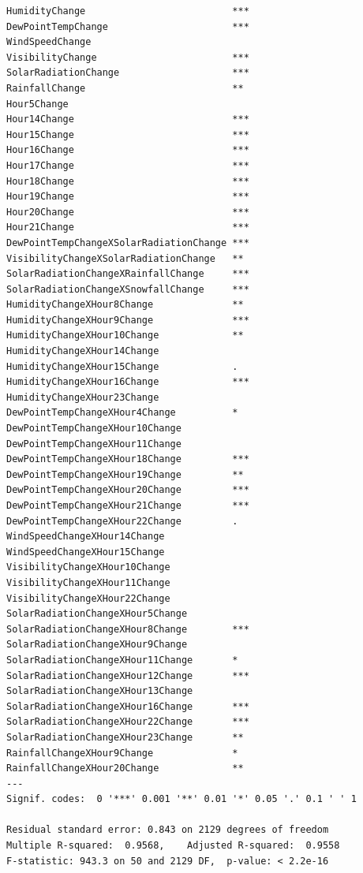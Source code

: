 \documentclass[
  letterpaper,
  DIV=11,
  numbers=noendperiod]{scrartcl}
\begin{document}
\begin{verbatim}
HumidityChange                          ***
DewPointTempChange                      ***
WindSpeedChange                            
VisibilityChange                        ***
SolarRadiationChange                    ***
RainfallChange                          ** 
Hour5Change                                
Hour14Change                            ***
Hour15Change                            ***
Hour16Change                            ***
Hour17Change                            ***
Hour18Change                            ***
Hour19Change                            ***
Hour20Change                            ***
Hour21Change                            ***
DewPointTempChangeXSolarRadiationChange ***
VisibilityChangeXSolarRadiationChange   ** 
SolarRadiationChangeXRainfallChange     ***
SolarRadiationChangeXSnowfallChange     ***
HumidityChangeXHour8Change              ** 
HumidityChangeXHour9Change              ***
HumidityChangeXHour10Change             ** 
HumidityChangeXHour14Change                
HumidityChangeXHour15Change             .  
HumidityChangeXHour16Change             ***
HumidityChangeXHour23Change                
DewPointTempChangeXHour4Change          *  
DewPointTempChangeXHour10Change            
DewPointTempChangeXHour11Change            
DewPointTempChangeXHour18Change         ***
DewPointTempChangeXHour19Change         ** 
DewPointTempChangeXHour20Change         ***
DewPointTempChangeXHour21Change         ***
DewPointTempChangeXHour22Change         .  
WindSpeedChangeXHour14Change               
WindSpeedChangeXHour15Change               
VisibilityChangeXHour10Change              
VisibilityChangeXHour11Change              
VisibilityChangeXHour22Change              
SolarRadiationChangeXHour5Change           
SolarRadiationChangeXHour8Change        ***
SolarRadiationChangeXHour9Change           
SolarRadiationChangeXHour11Change       *  
SolarRadiationChangeXHour12Change       ***
SolarRadiationChangeXHour13Change          
SolarRadiationChangeXHour16Change       ***
SolarRadiationChangeXHour22Change       ***
SolarRadiationChangeXHour23Change       ** 
RainfallChangeXHour9Change              *  
RainfallChangeXHour20Change             ** 
---
Signif. codes:  0 '***' 0.001 '**' 0.01 '*' 0.05 '.' 0.1 ' ' 1

Residual standard error: 0.843 on 2129 degrees of freedom
Multiple R-squared:  0.9568,    Adjusted R-squared:  0.9558 
F-statistic: 943.3 on 50 and 2129 DF,  p-value: < 2.2e-16
\end{verbatim}
\end{document}
